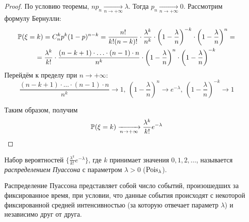     \begin{proof}
        По условию теоремы, $n p_n \xrightarrow[n \to +\infty]{} \lambda$. Тогда $p_n \xrightarrow[n \to +\infty]{} 0$. Рассмотрим формулу Бернулли:
        \begin{multline*}
            \operatorname{\mathbb{P}}(\xi = k) = C_n^k p^k (1 - p)^{n-k} = \frac{n!}{k!(n - k)!} \cdot \frac{\lambda^k}{n^k} \cdot \left(1 - \frac{\lambda}{n}\right)^{-k} \cdot \left(1 - \frac{\lambda}{n}\right)^n = \\
            = \frac{\lambda^k}{k!} \cdot \frac{(n - k + 1) \cdot \ldots \cdot (n - 1) \cdot n}{n^k} \cdot \left(1 - \frac{\lambda}{n}\right)^n \cdot \left(1 - \frac{\lambda}{n}\right)^{-k}
        \end{multline*}
        Перейдём к пределу при $n \to +\infty$:
        \begin{equation*}
            \frac{(n - k + 1) \cdot \ldots \cdot (n - 1) \cdot n}{n^k} \to 1,~ \left(1 - \frac{\lambda}{n}\right)^n \to e^{-\lambda},~ \left(1 - \frac{\lambda}{n}\right)^{-k} \to 1
        \end{equation*}
        
        Таким образом, получим
        \begin{equation*}
            \operatorname{\mathbb{P}}(\xi = k) \xrightarrow[n \to +\infty]{} \frac{\lambda^k}{k!} e^{-\lambda}
        \end{equation*}
    \end{proof}
    
    \begin{defn}
        Набор вероятностей $\{\frac{\lambda^k}{k!} e^{-\lambda} \}$, где $k$ принимает значения $0, 1, 2, \ldots$, называется \textit{распределением Пуассона} с параметром $\lambda > 0$ ($\operatorname{\mathrm{Pois}}_{\lambda}$).
    \end{defn}
    \begin{rmrk}
        Распределение Пуассона представляет собой число событий, произошедших за фиксированное время, при условии, что данные события происходят с некоторой фиксированной средней интенсивностью (за которую отвечает параметр $\lambda$) и независимо друг от друга.
    \end{rmrk}
    
